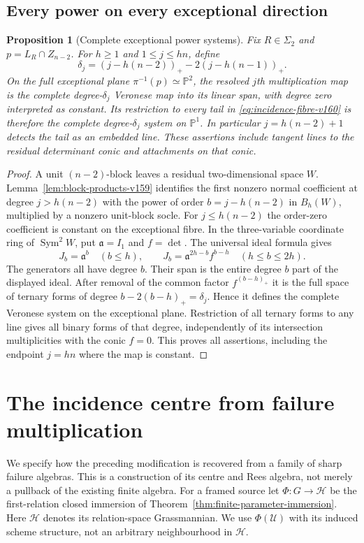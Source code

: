 \documentclass[11pt,reqno]{amsart}
\numberwithin{equation}{section}
\newtheorem{proposition}[theorem]{Proposition}
\theoremstyle{definition}\newtheorem{definition}[theorem]{Definition}
\theoremstyle{remark}\newtheorem{remark}[theorem]{Remark}
\newcommand{\Pj}{\mathbb P}\newcommand{\A}{\mathbb A}
\DeclareMathOperator{\Sym}{Sym}\DeclareMathOperator{\Gr}{Gr}
\begin{document}
\subsection{Every power on every exceptional direction}
\begin{proposition}[Complete exceptional power systems]
\label{prop:exceptional-powers-v160}
Fix $R\in\Sigma_2$ and $p=L_R\cap Z_{n-2}$. For $h\geq1$ and
$1\leq j\leq hn$, define
\begin{equation}\label{eq:exceptional-delta-v160}
 \delta_j=(j-h(n-2))_+-2(j-h(n-1))_+.
\end{equation}
On the full exceptional plane $\pi^{-1}(p)\simeq\Pj^2$, the resolved
$j$th multiplication map is the complete degree-$\delta_j$ Veronese
map into its linear span, with degree zero interpreted as constant.
Its restriction to every tail in \eqref{eq:incidence-fibre-v160} is
therefore the complete degree-$\delta_j$ system on $\Pj^1$.
In particular $j=h(n-2)+1$ detects the tail as an embedded line.
These assertions include tangent lines to the residual determinant
conic and attachments on that conic.
\end{proposition}
\begin{proof}
A unit $(n-2)$-block leaves a residual two-dimensional space $W$.
Lemma~\ref{lem:block-products-v159} identifies the first nonzero
normal coefficient at degree $j>h(n-2)$ with the power of order
$b=j-h(n-2)$ in $B_h(W)$, multiplied by a nonzero unit-block socle.
For $j\leq h(n-2)$ the order-zero coefficient is constant on the
exceptional fibre. In the three-variable coordinate ring of
$\Sym^2W$, put $\mathfrak a=I_1$ and $f=\det$. The universal ideal
formula gives
\[
 J_b=\mathfrak a^b\quad(b\leq h),\qquad
 J_b=\mathfrak a^{2h-b}f^{b-h}\quad(h\leq b\leq2h).
\]
The generators all have degree $b$. Their span is the entire degree
$b$ part of the displayed ideal. After removal of the common factor
$f^{(b-h)_+}$ it is the full space of ternary forms of degree
$b-2(b-h)_+=\delta_j$. Hence it defines the complete Veronese system
on the exceptional plane. Restriction of all ternary forms to any
line gives all binary forms of that degree, independently of its
intersection multiplicities with the conic $f=0$. This proves all
assertions, including the endpoint $j=hn$ where the map is constant.
\end{proof}

\section{The incidence centre from failure multiplication}
\label{sec:failure-incidence-v160}
We specify how the preceding modification is recovered from a family
of sharp failure algebras. This is a construction of its centre and
Rees algebra, not merely a pullback of the existing finite algebra.
For a framed source let $\Phi:G\to\mathcal H$ be the first-relation
closed immersion of Theorem~\ref{thm:finite-parameter-immersion}.
Here $\mathcal H$ denotes its relation-space Grassmannian. We use
$\Phi(\mathcal U)$ with its induced scheme structure, not an arbitrary
neighbourhood in $\mathcal H$.
\end{document}
